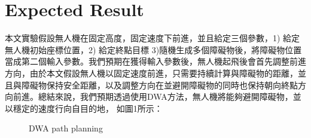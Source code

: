\documentclass[crop=false]{standalone}
\begin{document}
	\section{Expected Result}
	本文實驗假設無人機在固定高度，固定速度下前進，並且給定三個參數，1) 給定無人機初始座標位置，2) 給定終點目標 3)隨機生成多個障礙物後，將障礙物位置當成第二個輸入參數。我們預期在獲得輸入參數後，無人機起飛後會首先調整前進方向，由於本文假設無人機以固定速度前進，只需要持續計算與障礙物的距離，並且與障礙物保持安全距離，以及調整方向在並避開障礙物的同時也保持朝向終點方向前進。總結來說，我們預期透過使用DWA方法，無人機將能夠避開障礙物，並以穩定的速度行向自目的地， 如圖1所示：
    
    \begin{figure}[!ht]	
    	\centering
    	
    	\quad
    	
    	\quad
    	
    	\quad
    	

    	
    	\caption{DWA path planning}
    	\label{fig:DWA path planning}
    \end{figure}
\end{document}
